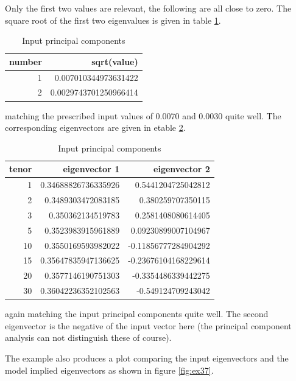 Only the first two values are relevant, the following are all close to zero. The square root of the first two
eigenvalues is given in table \ref{tab:ex37_3}.

\begin{table}[hbt]
\begin{center}
\begin{tabular}{r|r}
number & sqrt(value)                \\
\hline
1      & 0.007010344973631422       \\
2      & 0.0029743701250966414      \\
\end{tabular}
\caption{Input principal components}
\label{tab:ex37_3}
\end{center}
\end{table}

matching the prescribed input values of 0.0070 and 0.0030 quite well. The corresponding eigenvectors are given in etable
\ref{tab:ex37_4}.

\begin{table}[hbt]
\begin{center}
\begin{tabular}{r|r|r}
tenor & eigenvector 1       & eigenvector 2       \\
\hline
1     & 0.34688826736335926 & 0.5441204725042812  \\
2     & 0.3489303472083185  & 0.380259707350115   \\
3     & 0.350362134519783   & 0.2581408080614405  \\
5     & 0.3523983915961889  & 0.09230899007104967 \\
10    & 0.3550169593982022  & -0.11856777284904292\\
15    & 0.35647835947136625 & -0.23676104168229614\\
20    & 0.3577146190751303  & -0.3354486339442275 \\
30    & 0.36042236352102563 & -0.549124709243042  \\
\end{tabular}
\caption{Input principal components}
\label{tab:ex37_4}
\end{center}
\end{table}

again matching the input principal components quite well. The second eigenvector is the negative of the input vector
here (the principal component analysis can not distinguish these of course).

The example also produces a plot comparing the input eigenvectors and the model implied eigenvectors as shown in figure \ref{fig:ex37}.

